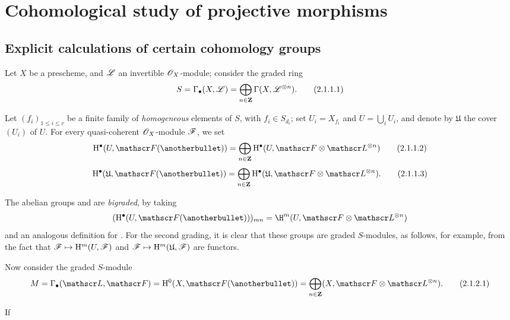 \section{Cohomological study of projective morphisms}
\label{section:III.2}


\subsection{Explicit calculations of certain cohomology groups}
\label{subsection:III.2.1}

\begin{env}[2.1.1]
\label{III.2.1.1}
Let $X$ be a prescheme, and $\mathscr{L}$ an invertible $\mathscr{O}_X$-module;
consider the graded ring 
\[
\label{III.2.1.1.1}
  S = \Gamma_\bullet(X,\mathscr{L}) = \bigoplus_{n\in\mathbf{Z}}\Gamma(X,\mathscr{L}^{\otimes n}).
\tag{2.1.1.1}
\]

Let $(f_i)_{1\leq i\leq r}$ be a finite family of \emph{homogeneous} elements of $S$, with $f_i\in S_{d_i}$;
set $U_i=X_{f_i}$ and $U=\bigcup_i U_i$, and denote by $\mathfrak{U}$ the cover $(U_i)$ of $U$.
For every quasi-coherent $\mathscr{O}_X$-module $\mathscr{F}$, we set
\[
\label{III.2.1.1.2}
  \HH^\bullet(U,\sh{F}(\anotherbullet)) = \bigoplus_{n\in\bb{Z}}\HH^\bullet(U,\sh{F}\otimes\sh{L}^{\otimes n})
\tag{2.1.1.2}
\]
\[
\label{III.2.1.1.3}
  \HH^\bullet(\mathfrak{U},\sh{F}(\anotherbullet)) = \bigoplus_{n\in\bb{Z}}\HH^\bullet(\mathfrak{U},\sh{F}\otimes\sh{L}^{\otimes n}).
\tag{2.1.1.3}
\]

The abelian groups  and  are \emph{bigraded}, by taking
\[
  (\HH^\bullet(U,\sh{F}(\anotherbullet)))_{mn} = \H^m(U,\sh{F}\otimes\sh{L}^{\otimes n})
\]
and an analogous definition for .
For the second grading, it is clear that these groups are graded $S$-modules, as follows, for example, from the fact that $\sh{F}\mapsto\HH^m(U,\sh{F})$ and $\sh{F}\mapsto\HH^m(\mathfrak{U},\sh{F})$ are functors.
\end{env}

\begin{env}[2.1.2]
\label{III.2.1.2}
Now consider the graded $S$-module 
\[
\label{III.2.1.2.1}
  M = \Gamma_\bullet(\sh{L},\sh{F}) = \HH^0(X,\sh{F}(\anotherbullet)) = \bigoplus_{n\in\bb{Z}}(X,\sh{F}\otimes\sh{L}^{\otimes n}).
\tag{2.1.2.1}
\]

If
\end{env}




